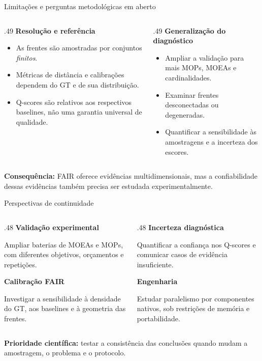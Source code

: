 \begin{frame}{Limitações e perguntas metodológicas em aberto}
\begin{columns}[T,onlytextwidth]
\begin{column}{.49\textwidth}
\textbf{Resolução e referência}\par\smallskip
\begin{itemize}\setlength\itemsep{5pt}
\item As frentes são amostradas por conjuntos \emph{finitos}.
\item Métricas de distância e calibrações dependem do GT e de sua distribuição.
\item Q-scores são relativos aos respectivos baselines, não uma garantia universal de qualidade.
\end{itemize}
\end{column}
\begin{column}{.49\textwidth}
\textbf{Generalização do diagnóstico}\par\smallskip
\begin{itemize}\setlength\itemsep{5pt}
\item Ampliar a validação para mais MOPs, MOEAs e cardinalidades.
\item Examinar frentes desconectadas ou degeneradas.
\item Quantificar a sensibilidade às amostragens e a incerteza dos escores.
\end{itemize}
\end{column}
\end{columns}
\vspace{.16cm}
\textbf{Consequência:} FAIR oferece evidências multidimensionais, mas a confiabilidade dessas evidências também precisa ser estudada experimentalmente.
\end{frame}

\begin{frame}{Perspectivas de continuidade}
\begin{columns}[T,onlytextwidth]
\begin{column}{.48\textwidth}
\textbf{Validação experimental}\par\smallskip
Ampliar baterias de MOEAs e MOPs, com diferentes objetivos, orçamentos e repetições.
\par\bigskip
\textbf{Calibração FAIR}\par\smallskip
Investigar a sensibilidade à densidade do GT, aos baselines e à geometria das frentes.
\end{column}
\begin{column}{.48\textwidth}
\textbf{Incerteza diagnóstica}\par\smallskip
Quantificar a confiança nos Q-scores e comunicar casos de evidência insuficiente.
\par\bigskip
\textbf{Engenharia}\par\smallskip
Estudar paralelismo por componentes nativos, sob restrições de memória e portabilidade.
\end{column}
\end{columns}
\vspace{.24cm}
\textbf{Prioridade científica:} testar a consistência das conclusões quando mudam a amostragem, o problema e o protocolo.
\end{frame}


